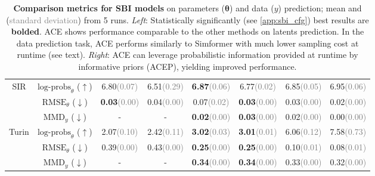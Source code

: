 \documentclass[twoside]{article}
\newcommand{\vtheta}{{\bm{\theta}}}
\begin{document}
\begin{table*}[!t]
{\begin{tabular}{cc|cccc|cc}
\midrule \midrule
\multirow{3}{*}{SIR} & $\text{log-probs}_{\theta}$ ($\uparrow$) &  6.80\textcolor{gray}{(0.07)}  &  6.51\textcolor{gray}{(0.29)}  &  \textbf{6.87}\textcolor{gray}{(0.06)}  &  6.77\textcolor{gray}{(0.02)}   & 6.85\textcolor{gray}{(0.05)}                   &  6.95\textcolor{gray}{(0.06)}                \\ 
                     & $\text{RMSE}_{\theta}$ ($\downarrow$)      &  \textbf{0.03}\textcolor{gray}{(0.00)}   &  0.04\textcolor{gray}{(0.00)}   &  0.07\textcolor{gray}{(0.02)}   &  \textbf{0.03}\textcolor{gray}{(0.00)}   &   0.03\textcolor{gray}{(0.00)}                 &   0.02\textcolor{gray}{(0.00)}                 \\  
                     & $\text{MMD}_{y}$ ($\downarrow$)  &  -        & -         &  \textbf{0.02}\textcolor{gray}{(0.00)}   &  \textbf{0.03}\textcolor{gray}{(0.00)}            &  0.02\textcolor{gray}{(0.00)}        &   0.00\textcolor{gray}{(0.00)}   \\ 
\midrule \midrule
\multirow{3}{*}{Turin} & $\text{log-probs}_{\theta}$ ($\uparrow$) &   2.07\textcolor{gray}{(0.10)}   &  2.42\textcolor{gray}{(0.11)}  & \textbf{3.02}\textcolor{gray}{(0.03)}  &  \textbf{3.01}\textcolor{gray}{(0.01)}   &     6.06\textcolor{gray}{(0.12)}             &      7.58\textcolor{gray}{(0.73)}        \\ 
                     & $\text{RMSE}_{\theta}$ ($\downarrow$)      &  0.39\textcolor{gray}{(0.00)}   &  0.43\textcolor{gray}{(0.00)}   &  \textbf{0.25}\textcolor{gray}{(0.00)}   &  \textbf{0.25}\textcolor{gray}{(0.00)}   &  0.10\textcolor{gray}{(0.01)}                  &  0.08\textcolor{gray}{(0.01)}                  \\  
                     & $\text{MMD}_{y}$ ($\downarrow$)  &  -          &  -   &  \textbf{0.34}\textcolor{gray}{(0.00)}    &   \textbf{0.34}\textcolor{gray}{(0.00)}             &      0.33\textcolor{gray}{(0.00)}       & 0.32\textcolor{gray}{(0.00)}       \\ 
\bottomrule
\end{tabular}}


\caption{\textbf{Comparison metrics for SBI models} on parameters ($\vtheta$) and data ($y$) prediction; mean and (\textcolor{gray}{standard deviation}) from 5 runs. \emph{Left}: Statistically significantly (see \cref{app:sbi_cfg}) best results are \textbf{bolded}. ACE shows performance comparable to the other methods on latents prediction. In the data prediction task, ACE performs similarly to Simformer with much lower sampling cost at runtime (see text). \emph{Right}: ACE can leverage probabilistic information provided at runtime by informative priors (ACEP), yielding improved performance.}
\label{tab:sbi}
\end{table*}
\end{document}

